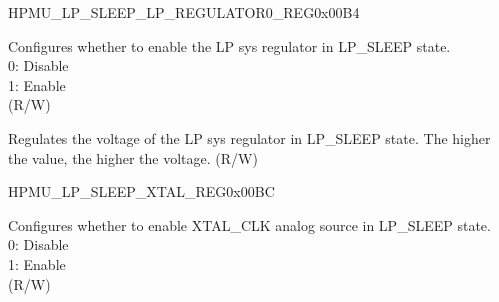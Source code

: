 \begin{register}{H}{PMU\_LP\_SLEEP\_LP\_REGULATOR0\_REG}{0x00B4}\label{regdesc:PMULPSLEEPLPREGULATOR0REG}
%
%
%
%
\regnewline%
\begin{regdesc}\begin{reglist}

\label{fielddesc:PMULPSLEEPLPREGULATORXPD}\item [PMU\_LP\_SLEEP\_LP\_REGULATOR\_XPD] Configures whether to enable the LP sys regulator in LP\_SLEEP state. \\
0: Disable\\
1: Enable\\
(R/W)
\label{fielddesc:PMULPSLEEPLPREGULATORDBIAS}\item [PMU\_LP\_SLEEP\_LP\_REGULATOR\_DBIAS] Regulates the voltage of the LP sys regulator in LP\_SLEEP state. The higher the value, the higher the voltage. (R/W)
\end{reglist}\end{regdesc}
\end{register}


\begin{register}{H}{PMU\_LP\_SLEEP\_XTAL\_REG}{0x00BC}\label{regdesc:PMULPSLEEPXTALREG}
%
%
\regnewline%
\begin{regdesc}\begin{reglist}
\label{fielddesc:PMULPSLEEPXPDXTAL}\item [PMU\_LP\_SLEEP\_XPD\_XTAL] Configures whether to enable XTAL\_CLK analog source in LP\_SLEEP state.\\
0: Disable\\
1: Enable\\
(R/W)
\end{reglist}\end{regdesc}
\end{register}


